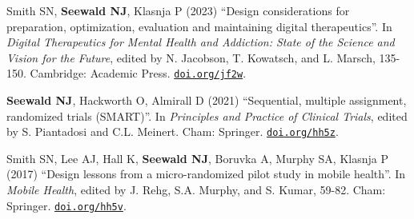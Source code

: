 \documentclass[letterpaper,11pt]{article} %
\begin{document}
		\begin{etaremune}			
			\item Smith SN, \textbf{Seewald NJ}, Klasnja P (2023) ``Design considerations for preparation, optimization, evaluation and maintaining digital therapeutics''. In \textit{Digital Therapeutics for Mental Health and Addiction: State of the Science and Vision for the Future}, edited by N. Jacobson, T. Kowatsch, and L. Marsch, 135-150. Cambridge: Academic Press. \href{https://doi.org/jf2w}{\texttt{doi.org/jf2w}}.
			
			\item \textbf{Seewald NJ}, Hackworth O, Almirall D (2021) ``Sequential, multiple assignment, randomized trials (SMART)''. In \textit{Principles and Practice of Clinical Trials}, edited by S. Piantadosi and C.L. Meinert. Cham: Springer. \href{https://doi.org/hh5z}{\texttt{doi.org/hh5z}}.
			
			\item  Smith SN, Lee AJ, Hall K, \textbf{Seewald NJ}, Boruvka A, Murphy SA, Klasnja P (2017) ``Design lessons from a micro-randomized pilot study in mobile health''. In \textit{Mobile Health}, edited by J. Rehg, S.A. Murphy, and S. Kumar, 59-82. Cham: Springer. \href{https://doi.org/hh5v}{\texttt{doi.org/hh5v}}.
		\end{etaremune}
		
\end{document}
